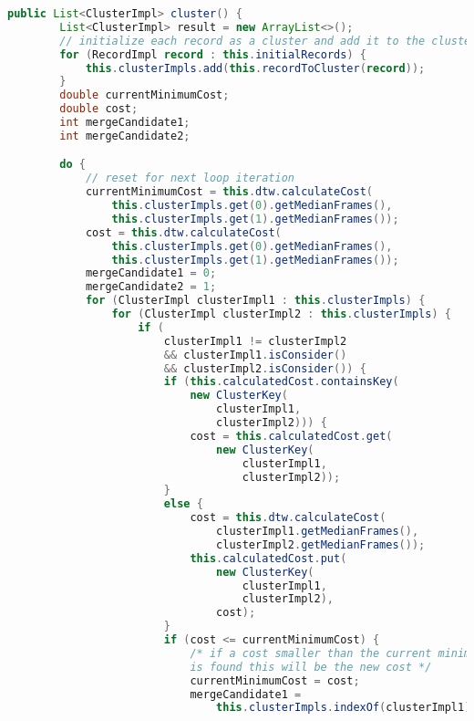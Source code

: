 \begin{lstlisting}[language=Java, caption=Hierarchisches Clustering.]
    public List<ClusterImpl> cluster() {
        List<ClusterImpl> result = new ArrayList<>();
        // initialize each record as a cluster and add it to the clusters list
        for (RecordImpl record : this.initialRecords) {
            this.clusterImpls.add(this.recordToCluster(record));
        }
        double currentMinimumCost;
        double cost;
        int mergeCandidate1;
        int mergeCandidate2;

        do {
            // reset for next loop iteration
            currentMinimumCost = this.dtw.calculateCost(    
                this.clusterImpls.get(0).getMedianFrames(),
                this.clusterImpls.get(1).getMedianFrames());
            cost = this.dtw.calculateCost(  
                this.clusterImpls.get(0).getMedianFrames(),
                this.clusterImpls.get(1).getMedianFrames());
            mergeCandidate1 = 0;
            mergeCandidate2 = 1;
            for (ClusterImpl clusterImpl1 : this.clusterImpls) {
                for (ClusterImpl clusterImpl2 : this.clusterImpls) {
                    if (
                        clusterImpl1 != clusterImpl2
                        && clusterImpl1.isConsider()
                        && clusterImpl2.isConsider()) {
                        if (this.calculatedCost.containsKey(
                            new ClusterKey(
                                clusterImpl1,
                                clusterImpl2))) {
                            cost = this.calculatedCost.get(
                                new ClusterKey(
                                    clusterImpl1,
                                    clusterImpl2));
                        }
                        else {
                            cost = this.dtw.calculateCost(
                                clusterImpl1.getMedianFrames(),
                                clusterImpl2.getMedianFrames());
                            this.calculatedCost.put(
                                new ClusterKey(
                                    clusterImpl1,
                                    clusterImpl2),
                                cost);
                        }
                        if (cost <= currentMinimumCost) {
                            /* if a cost smaller than the current minimum cost
                            is found this will be the new cost */
                            currentMinimumCost = cost;
                            mergeCandidate1 =
                                this.clusterImpls.indexOf(clusterImpl1);

\end{lstlisting}
